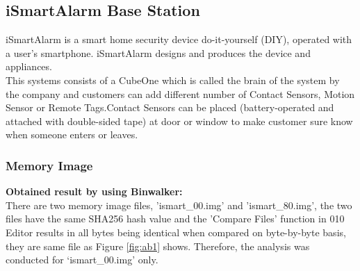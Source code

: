 \documentclass{easychair}
\begin{document}
\newpage
\subsection{iSmartAlarm Base Station}
iSmartAlarm is a smart home security device do-it-yourself (DIY), operated with a user's smartphone. iSmartAlarm designs and produces the device and appliances.\cite{pari_4}\\
This systems consists of a CubeOne which is called the brain of the system by the company and customers can add different number of Contact Sensors, Motion Sensor or Remote Tags.Contact Sensors can be placed (battery-operated and attached with double-sided tape) at door or window to make customer sure know when someone enters or leaves.\cite{pari_5}\\   
\subsubsection{Memory Image}
\textbf{Obtained result by using Binwalker:}\\
There are two memory image files, 'ismart\_00.img' and 'ismart\_80.img', the two files have the same SHA256 hash value and the 'Compare Files' function in 010 Editor results in all bytes being identical when compared on byte-by-byte basis, they are same file as Figure \ref{fig:ab1} shows. Therefore, the analysis was conducted for ‘ismart\_00.img’ only. 
\end{document}
